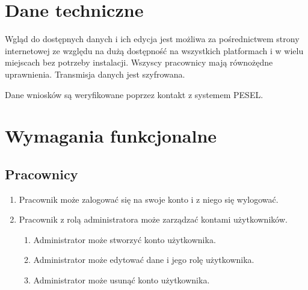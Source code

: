 \documentclass[12pt]{article}
\begin{document}
\section{Dane techniczne}
Wgląd do dostępnych danych i ich edycja jest możliwa za pośrednictwem strony internetowej ze względu na dużą dostępność na wszystkich platformach i w wielu miejscach bez potrzeby instalacji. Wszyscy pracownicy mają równożędne uprawnienia. Transmisja danych jest szyfrowana.

Dane wniosków są weryfikowane poprzez kontakt z systemem PESEL.
\section{Wymagania funkcjonalne}

\subsection{Pracownicy}
\begin{enumerate}
    \item Pracownik może zalogować się na swoje konto i z niego się wylogować.
    \item Pracownik z rolą administratora może zarządzać kontami użytkowników.
    \begin{enumerate}
        \item Administrator może stworzyć konto użytkownika.
        \item Administrator może edytować dane i jego rolę użytkownika.
        \item Administrator może usunąć konto użytkownika.
    \end{enumerate}
\end{enumerate}
\end{document}
